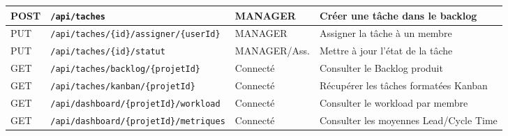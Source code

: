 \documentclass[12pt,a4paper]{report}
\begin{document}
\begin{longtable}{|p{1.5cm}|p{5.5cm}|p{2cm}|p{5cm}|}
POST & \verb|/api/taches| & MANAGER & Créer une tâche dans le backlog \\ \hline
PUT & \verb|/api/taches/{id}/assigner/{userId}| & MANAGER & Assigner la tâche à un membre \\ \hline
PUT & \verb|/api/taches/{id}/statut| & MANAGER/Ass. & Mettre à jour l'état de la tâche \\ \hline
GET & \verb|/api/taches/backlog/{projetId}| & Connecté & Consulter le Backlog produit \\ \hline
GET & \verb|/api/taches/kanban/{projetId}| & Connecté & Récupérer les tâches formatées Kanban \\ \hline
GET & \verb|/api/dashboard/{projetId}/workload| & Connecté & Consulter le workload par membre \\ \hline
GET & \verb|/api/dashboard/{projetId}/metriques| & Connecté & Consulter les moyennes Lead/Cycle Time \\ \hline
\end{longtable}
\end{document}
